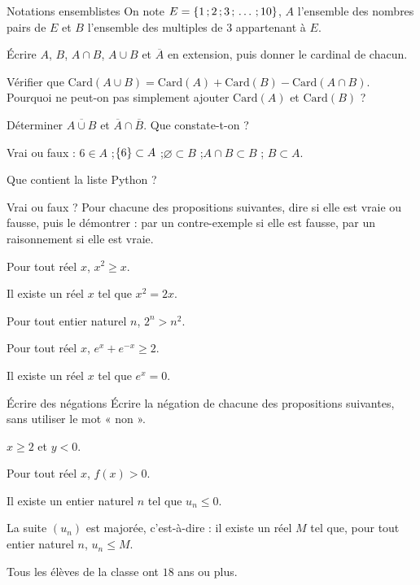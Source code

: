 \exercices
{}

\begin{exercice}[1]{Notations ensemblistes}
On note $E=\left\{1\,{;}\,2\,{;}\,3\,{;}\,\dots\,{;}\,10\right\}$, $A$ l'ensemble des nombres pairs de $E$ et $B$ l'ensemble des multiples de $3$
appartenant à $E$.
\begin{questions}
  \item Écrire $A$, $B$, $A\cap B$, $A\cup B$ et $\overline{A}$ en extension, puis donner le cardinal de chacun.
  \item Vérifier que $\mathrm{Card}(A\cup B)=\mathrm{Card}(A)+\mathrm{Card}(B)-\mathrm{Card}(A\cap B)$. Pourquoi ne peut-on pas
    simplement ajouter $\mathrm{Card}(A)$ et $\mathrm{Card}(B)$ ?
  \item Déterminer $\overline{A\cup B}$ et $\overline{A}\cap\overline{B}$. Que constate-t-on ?
  \item Vrai ou faux : $6\in A$ ;\enspace $\left\{6\right\}\subset A$ ;\enspace $\varnothing\subset B$ ;\enspace $A\cap B\subset B$ ;\enspace
    $B\subset A$.
  \item Que contient la liste Python \code{[n for n in range(1, 11) if n \% 2 == 0 or n \% 3 == 0]} ?
\end{questions}
\end{exercice}

\begin{exercice}[1]{Vrai ou faux ?}
Pour chacune des propositions suivantes, dire si elle est vraie ou fausse, puis le démontrer : par un contre-exemple si elle est
fausse, par un raisonnement si elle est vraie.
\begin{questions}
  \item Pour tout réel $x$, $x^{2}\geq x$.
  \item Il existe un réel $x$ tel que $x^{2}=2x$.
  \item Pour tout entier naturel $n$, $2^{n}>n^{2}$.
  \item Pour tout réel $x$, $e^{x}+e^{-x}\geq2$.
  \item Il existe un réel $x$ tel que $e^{x}=0$.
\end{questions}
\end{exercice}

\begin{exercice}[1]{Écrire des négations}
Écrire la négation de chacune des propositions suivantes, sans utiliser le mot « non ».
\begin{questions}
  \item $x\geq2$ et $y<0$.
  \item Pour tout réel $x$, $f(x)>0$.
  \item Il existe un entier naturel $n$ tel que $u_n\leq0$.
  \item La suite $(u_n)$ est majorée, c'est-à-dire : il existe un réel $M$ tel que, pour tout entier naturel $n$, $u_n\leq M$.
  \item Tous les élèves de la classe ont $18$ ans ou plus.
\end{questions}
\end{exercice}

